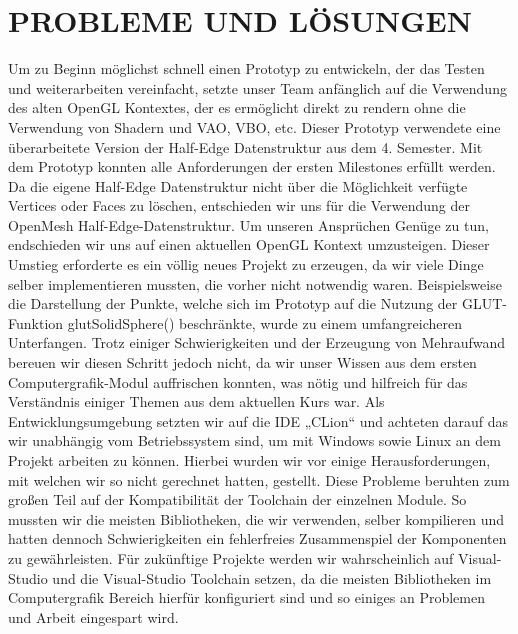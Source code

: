 	
	\section{\Large PROBLEME UND LÖSUNGEN}
Um zu Beginn möglichst schnell einen Prototyp zu entwickeln, der das Testen und weiterarbeiten vereinfacht, setzte unser Team anfänglich auf die Verwendung des alten OpenGL Kontextes, der es ermöglicht direkt zu rendern ohne die Verwendung von Shadern und VAO, VBO, etc. Dieser Prototyp verwendete eine überarbeitete Version der Half-Edge Datenstruktur aus dem 4. Semester. Mit dem Prototyp konnten alle Anforderungen der ersten Milestones erfüllt werden. \newline
Da die eigene Half-Edge Datenstruktur nicht über die Möglichkeit verfügte Vertices oder Faces zu löschen, entschieden wir uns für die Verwendung der OpenMesh Half-Edge-Datenstruktur.\newline
Um unseren Ansprüchen Genüge zu tun, endschieden wir uns auf einen aktuellen OpenGL Kontext umzusteigen. Dieser Umstieg erforderte es ein völlig neues Projekt zu erzeugen, da wir viele Dinge selber implementieren mussten, die vorher nicht notwendig waren. Beispielsweise die Darstellung der Punkte, welche sich im Prototyp auf die Nutzung der GLUT-Funktion glutSolidSphere() beschränkte, wurde zu einem umfangreicheren Unterfangen. Trotz einiger Schwierigkeiten und der Erzeugung von Mehraufwand bereuen wir diesen Schritt jedoch nicht, da wir unser Wissen aus dem ersten Computergrafik-Modul auffrischen konnten, was nötig und hilfreich für das Verständnis einiger Themen aus dem aktuellen Kurs war.\newline
Als Entwicklungsumgebung setzten wir auf die IDE „CLion“ und achteten darauf das wir unabhängig vom Betriebssystem sind, um mit Windows sowie Linux an dem Projekt arbeiten zu können. Hierbei wurden wir vor einige Herausforderungen, mit welchen wir so nicht gerechnet hatten, gestellt. Diese Probleme beruhten zum großen Teil auf der Kompatibilität der Toolchain der einzelnen Module. So mussten wir die meisten Bibliotheken, die wir verwenden, selber kompilieren und hatten dennoch Schwierigkeiten ein fehlerfreies Zusammenspiel der Komponenten zu gewährleisten. Für zukünftige Projekte werden wir wahrscheinlich auf Visual-Studio und die Visual-Studio Toolchain setzen, da die meisten Bibliotheken im Computergrafik Bereich hierfür konfiguriert sind und so einiges an Problemen und Arbeit eingespart wird.





